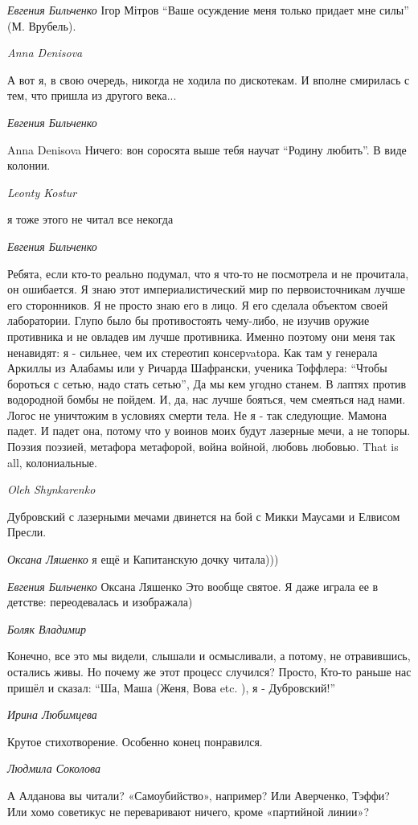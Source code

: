 \emph{Евгения Бильченко}
Ігор Мітров \enquote{Ваше осуждение меня только придает мне силы} (М. Врубель).

\emph{Anna Denisova}

А вот я, в свою очередь, никогда не ходила по дискотекам. И вполне смирилась с
тем, что пришла из другого века...🙂

\emph{Евгения Бильченко}

Anna Denisova Ничего: вон соросята выше тебя научат \enquote{Родину любить}. В виде колонии.

\emph{Leonty Kostur}

я тоже этого не читал все некогда

\emph{Евгения Бильченко}

Ребята, если кто-то реально подумал, что я что-то не посмотрела и не прочитала,
он ошибается. Я знаю этот империалистический мир по первоисточникам лучше его
сторонников. Я не просто знаю его в лицо. Я его сделала объектом своей
лаборатории. Глупо было бы противостоять чему-либо, не изучив оружие противника
и не овладев им лучше противника. Именно поэтому они меня так ненавидят: я -
сильнее, чем их стереотип консерvatора. Как там у генерала Аркиллы из Алабамы
или у Ричарда Шафрански, ученика Тоффлера: \enquote{Чтобы бороться с сетью,
надо стать сетью}, Да мы кем угодно станем. В лаптях против водородной бомбы не
пойдем. И, да, нас лучше бояться, чем смеяться над нами. Логос не уничтожим в
условиях смерти тела. Не я - так следующие. Мамона падет. И падет она, потому
что у воинов моих будут лазерные мечи, а не топоры. Поэзия поэзией, метафора
метафорой, война войной, любовь любовью. That is all, колониальные.

\emph{Oleh Shynkarenko}

Дубровский с лазерными мечами двинется на бой с Микки Маусами и Елвисом Пресли.

\emph{Оксана Ляшенко}
я ещё и Капитанскую дочку читала)))

\emph{Евгения Бильченко}
Оксана Ляшенко Это вообще святое. Я даже играла ее в детстве: переодевалась и
изображала)

\emph{Боляк Владимир}

Конечно, все это мы видели, слышали и осмысливали, а потому, не отравившись,
остались живы. Но почему же этот процесс случился? Просто, Кто-то раньше нас
пришёл и сказал: \enquote{Ша, Маша (Женя, Вова etc. ), я - Дубровский!}

\emph{Ирина Любимцева}

Крутое стихотворение. Особенно конец понравился.

\emph{Людмила Соколова}

А Алданова вы читали? «Самоубийство», например? Или Аверченко, Тэффи? Или хомо
советикус не переваривают ничего, кроме «партийной линии»?
